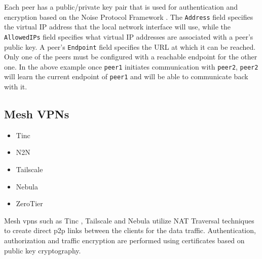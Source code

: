Each peer has a public/private key pair that is used for authentication
and encryption based on the Noise Protocol Framework
\autocite{noiseDocs}. The \texttt{Address} field specifies the virtual
IP address that the local network interface will use, while the
\texttt{AllowedIPs} field specifies what virtual IP addresses are
associated with a peer's public key. A peer's \texttt{Endpoint} field
specifies the URL at which it can be reached. Only one of the peers must
be configured with a reachable endpoint for the other one. In the above
example once \texttt{peer1} initiates communication with \texttt{peer2},
\texttt{peer2} will learn the current endpoint of \texttt{peer1} and
will be able to communicate back with it.

\hypertarget{mesh-vpns}{%
\subsection{Mesh VPNs}\label{mesh-vpns}}

\begin{itemize}
\tightlist
\item
  Tinc
\item
  N2N
\item
  Tailscale
\item
  Nebula
\item
  ZeroTier
\end{itemize}

Mesh \glspl{vpn} such as Tinc \autocite{tincDocs}, Tailscale
\autocite{tailscaleDocs} and Nebula \autocite{nebulaDocs} utilize NAT
Traversal techniques to create direct \gls{p2p} links between the
clients for the data traffic. Authentication, authorization and traffic
encryption are performed using certificates based on public key
cryptography.

